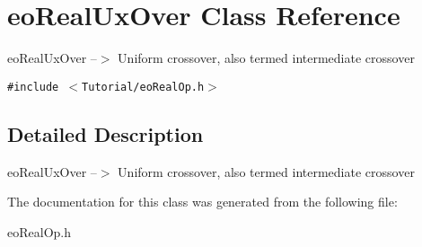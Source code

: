\section{eo\-Real\-Ux\-Over Class Reference}
\label{classeo_real_ux_over}
eo\-Real\-Ux\-Over --$>$ Uniform crossover, also termed intermediate crossover  


{\tt \#include $<$Tutorial/eo\-Real\-Op.h$>$}



\subsection{Detailed Description}
eo\-Real\-Ux\-Over --$>$ Uniform crossover, also termed intermediate crossover 



The documentation for this class was generated from the following file:\begin{CompactItemize}
\item 
eo\-Real\-Op.h\end{CompactItemize}
